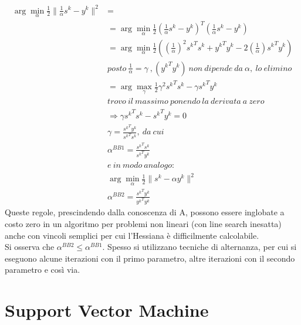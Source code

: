 \documentclass{report}
\begin{document}
\begin{equation} 
\label{BB6}
	\begin{split}
	\arg\min_{\alpha} \frac{1}{2} \|\frac{1}{\alpha} s^k - y^k\|^2& =\\
	 &= \arg\min_{\alpha} \frac{1}{2}\left (\frac{1}{\alpha} s^k - y^k\right)^T\left(\frac{1}{\alpha} s^k - y^k\right)\\
	 &= \arg\min_{\alpha} \frac{1}{2} \left(\left(\frac{1}{\alpha}\right)^2 {s^k}^T s^k + {y^k}^T y^k-2\left(\frac{1}{\alpha}\right){s^k}^T y^k\right)\\
	 & posto\  \frac{1}{\alpha} = \gamma \ ,({y^k}^T y^k)\ non\ dipende\ da\ \alpha,\ lo\ elimino\\
	 &=  \arg\max_{\gamma} \frac{1}{2} \gamma^2 {s^k}^T s^k -\gamma{s^k}^T y^k\\
	 &trovo\ il\ massimo\ ponendo\ la\ derivata\ a\ zero\\
	 &\Rightarrow \gamma {s^k}^T s^k -{s^k}^T y^k = 0\\
	 & \gamma = \frac{{s^k}^T y^k}{{s^k}^T s^k}, \ da\ cui\\
	 & \alpha^{BB1} = \frac{{s^k}^T s^k}{{s^k}^T y^k}\\
	 & e\ in\ modo\ analogo: \\
	 & \arg\min_{\alpha} \frac{1}{2} \|s^k - \alpha y^k\|^2 \\
	 & \alpha^{BB2} = \frac{{s^k}^T y^k}{{y^k}^T y^k}
	\end{split}
\end{equation}
Queste regole, prescindendo dalla conoscenza di A, possono essere inglobate a costo zero in un algoritmo per problemi non lineari (con line search inesatta) anche con vincoli semplici per cui l'Hessiana è difficilmente calcolabile.\\
Si osserva che $\alpha^{BB2} \leqslant \alpha^{BB1}$. Spesso si utilizzano tecniche di alternanza, per cui si eseguono alcune iterazioni con il primo parametro, altre iterazioni con il secondo parametro e così via.

\chapter{Support Vector Machine}
\end{document}
